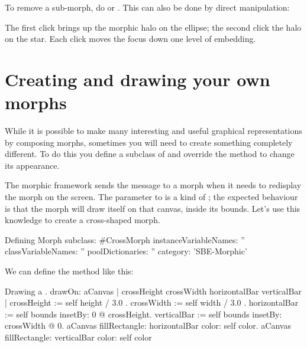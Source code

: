 \documentclass[a4paper,10pt,twoside]{book}
\begin{document}
To remove a sub-morph, do    or  .  This can also be done by direct manipulation:


\noindent
The first click brings up the morphic halo on the ellipse; the second click the halo on the star.   Each click moves the focus down one level of embedding.


\section{Creating and drawing your own morphs}

While it is possible to make many interesting and useful graphical representations by composing morphs, sometimes you will need to create something completely different.
To do this you define a subclass of  and override the  method to change its appearance.

The morphic framework sends the message  to a morph when it needs to redisplay the morph on the screen.  The parameter to   is a kind of ; the expected behaviour is that the morph will draw itself on that canvas, inside its bounds.
Let's use this knowledge to create a cross-shaped morph.

\begin{classdef}{Defining }
Morph subclass: #CrossMorph
	instanceVariableNames: ''
	classVariableNames: ''
	poolDictionaries: ''
	category: 'SBE-Morphic'
\end{classdef}

We can define the  method like this:
\begin{method}[firstDrawOn]{Drawing a .}
drawOn: aCanvas 
	| crossHeight crossWidth horizontalBar verticalBar |
	crossHeight := self height / 3.0 .
	crossWidth := self width / 3.0 .
	horizontalBar := self bounds insetBy: 0 @ crossHeight.
	verticalBar := self bounds insetBy: crossWidth @ 0.
	aCanvas fillRectangle: horizontalBar color: self color.
	aCanvas fillRectangle: verticalBar color: self color
\end{method}
\end{document}
